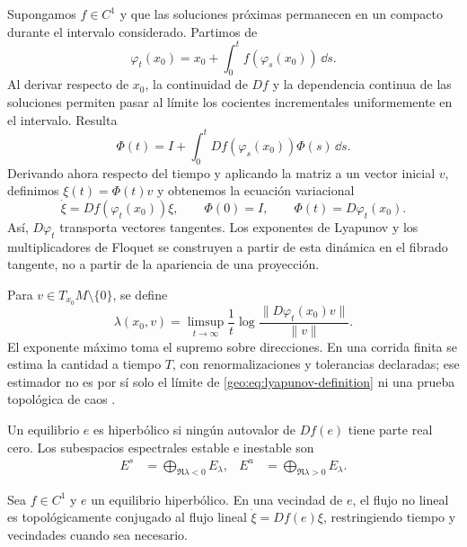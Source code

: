 Supongamos \(f\in C^1\) y que las soluciones próximas permanecen en un
compacto durante el intervalo considerado. Partimos de
\[
 \varphi_t(x_0)=x_0+\int_0^t f(\varphi_s(x_0))\,\dd s.
\]
Al derivar respecto de \(x_0\), la continuidad de \(Df\) y la dependencia
continua de las soluciones permiten pasar al límite los cocientes
incrementales uniformemente en el intervalo. Resulta
\[
 \Phi(t)=I+\int_0^t Df(\varphi_s(x_0))\Phi(s)\,\dd s.
\]
Derivando ahora respecto del tiempo y aplicando la matriz a un vector inicial
\(v\), definimos \(\xi(t)=\Phi(t)v\) y obtenemos la ecuación variacional
\begin{equation}
 \dot\xi=Df(\varphi_t(x_0))\xi,
 \qquad \Phi(0)=I,\qquad
 \Phi(t)=D\varphi_t(x_0).
 \label{geo:eq:variational}
\end{equation}
Así, \(D\varphi_t\) transporta vectores tangentes. Los exponentes de Lyapunov
y los multiplicadores de Floquet se construyen a partir de esta dinámica en
el fibrado tangente, no a partir de la apariencia de una proyección.

\begin{definition}
Para \(v\in T_{x_0}M\setminus\{0\}\), se define
\begin{equation}
 \lambda(x_0,v)=\limsup_{t\to\infty}
 \frac{1}{t}\log\frac{\|D\varphi_t(x_0)v\|}{\|v\|}.
 \label{geo:eq:lyapunov-definition}
\end{equation}
El exponente máximo toma el supremo sobre direcciones. En una corrida finita
se estima la cantidad a tiempo \(T\), con renormalizaciones y tolerancias
declaradas; ese estimador no es por sí solo el límite de
\cref{geo:eq:lyapunov-definition} ni una prueba topológica de caos
\cite{Skokos2010,DatserisParlitz2022Nonlinear}.
\end{definition}

\begin{definition}
Un equilibrio \(e\) es hiperbólico si ningún autovalor de \(Df(e)\) tiene
parte real cero. Los subespacios espectrales estable e inestable son
\begin{align}
 E^s&=\bigoplus_{\Re\lambda<0}E_\lambda,
 &E^u&=\bigoplus_{\Re\lambda>0}E_\lambda.
 \label{geo:eq:spectral-splitting}
\end{align}
\end{definition}

\begin{proposition}
Sea \(f\in C^1\) y \(e\) un equilibrio hiperbólico. En una vecindad de \(e\),
el flujo no lineal es topológicamente conjugado al flujo lineal
\(\dot\xi=Df(e)\xi\), restringiendo tiempo y vecindades cuando sea necesario.
\end{proposition}

